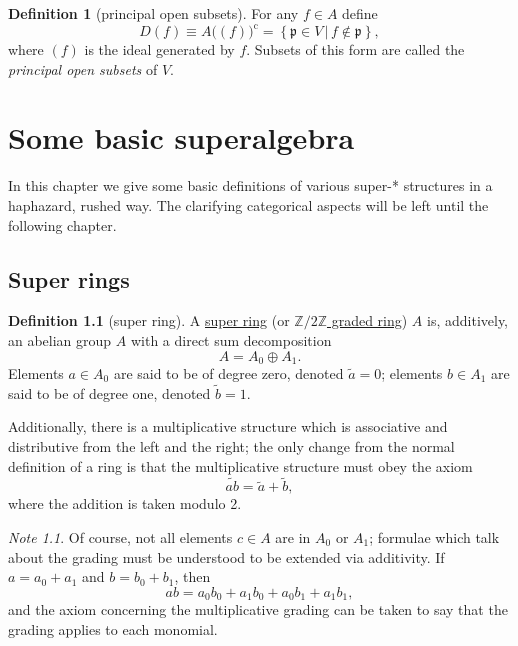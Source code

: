 \documentclass[a4paper,10pt]{scrreprt}
\newcommand{\Z}{\mathbb{Z}}
\newcommand{\defn}[1]{\ul{#1}}
\theoremstyle{definition}
\newtheorem{definition}{Definition}[section]
\theoremstyle{plain}
\theoremstyle{remark}
\newtheorem{note}{Note}[section]
\begin{document}
\begin{definition}[principal open subsets]
  \label{def:principalopensubsets}
  For any $f \in A$ define 
  \begin{equation*}
    D(f) \equiv A\big((f)\big)^{\mathrm{c}} = \left\{ \mathfrak{p} \in V\,\big|\, f \notin \mathfrak{p} \right\},
  \end{equation*}
  where $(f)$ is the ideal generated by $f$. Subsets of this form are called the \emph{principal open subsets} of $V$.
\end{definition}




\chapter{Some basic superalgebra} 
In this chapter we give some basic definitions of various super-* structures in a haphazard, rushed way. The clarifying categorical aspects will be left until the following chapter.
\section{Super rings}
\begin{definition}[super ring]
  \label{def:superring}
  A \defn{super ring} (or \defn{$\Z/2\Z$ graded ring}) $A$ is, additively, an abelian group $A$ with a direct sum decomposition
  \begin{equation*}
    A = A_{0} \oplus A_{1}.
  \end{equation*}
  Elements $a\in A_{0}$ are said to be of degree zero, denoted $\tilde{a} = 0$; elements $b\in A_{1}$ are said to be of degree one, denoted $\tilde{b} = 1$.

  Additionally, there is a multiplicative structure which is associative and distributive from the left and the right; the only change from the normal definition of a ring is that the multiplicative structure must obey the axiom
  \begin{equation*}
    \widetilde{ab} = \tilde{a} + \tilde{b},
  \end{equation*}
  where the addition is taken modulo 2.
\end{definition}

\begin{note}
  Of course, not all elements $c \in A$ are in $A_{0}$ or $A_{1}$; formulae which talk about the grading must be understood to be extended via additivity. If $a = a_{0} + a_{1}$ and $b = b_{0} + b_{1}$, then
  \begin{equation*}
    ab = a_{0} b_{0} + a_{1} b_{0} + a_{0} b_{1} + a_{1} b_{1},
  \end{equation*}
  and the axiom concerning the multiplicative grading can be taken to say that the grading applies to each monomial.
\end{note}
\end{document}
